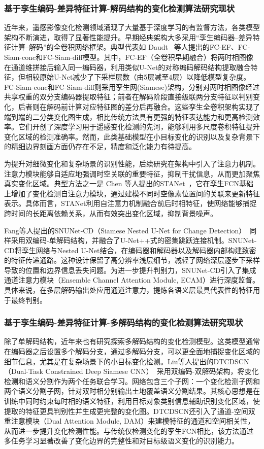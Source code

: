 \subsubsection{基于孪生编码-差异特征计算-解码结构的变化检测算法研究现状}

近年来，遥感影像变化检测领域涌现了大量基于深度学习的有监督方法，各类模型架构不断演进，取得了显著性能提升。早期经典架构大多采用“孪生编码器–差异特征计算–解码”的全卷积网络框架。典型代表如 Daudt~\cite{Daudt2018FullyCS} 等人提出的FC-EF、FC-Siam-conc和FC-Siam-diff模型。其中，FC-EF（全卷积早期融合）将两时相图像在通道维拼接后输入同一编码器，利用类似U-Net的对称编码解码结构提取融合特征，但相较原始U-Net减少了下采样层数（由5层减至4层）以降低模型复杂度。FC-Siam-conc和FC-Siam-diff则采用孪生网(Siamese)架构，分别对两时相图像经过共享权重的双分支编码器提取特征；前者在解码阶段直接级联两分支特征以判别变化，后者则在解码前计算对应特征图的差分后再融合。这些孪生全卷积架构实现了端到端的二分类变化图生成，相比传统方法具有更强的特征表达能力和更高检测效率。它们开创了深度学习用于遥感变化检测的先河，能够利用多尺度卷积特征提升变化区域的检测准确率。然而，此类基础模型在小目标变化的识别以及复杂背景下的精细边界刻画方面仍存在不足，精度和泛化能力有待提高。

为提升对细微变化和复杂场景的识别性能，后续研究在架构中引入了注意力机制。注意力模块能够自适应地强调时空关联的重要特征，抑制干扰信息，从而更加聚焦真实变化区域。典型方法之一是 Chen 等人提出的STANet~\cite{chen_spatial-temporal_2020}，它在孪生FCN基础上增加了变化检测自注意力模块，通过建模不同时空像素位置间的关联来更新特征表示。具体而言，STANet利用自注意力机制融合前后时相特征，使网络能够捕捉跨时间的长距离依赖关系，从而有效突出变化区域，抑制背景噪声。

Fang等人提出的SNUNet-CD（Siamese Nested U-Net for Change Detection）~\cite{Fang2021SNUNetCDAD}同样采用双编码-单解码结构，并融合了U-Net++式的密集跳跃连接机制。SNUNet-CD将孪生网络与Nested U-Net结合，在编码器和解码器以及解码器内部构建致密的特征传递通路。这种设计保留了高分辨率浅层细节，减轻了网络深层逐步下采样导致的位置和边界信息丢失问题。为进一步提升判别力，SNUNet-CD引入了集成通道注意力模块（Ensemble Channel Attention Module, ECAM）进行深度监督。具体来说，在多层解码输出处应用通道注意力，提炼各语义层最具代表性的特征用于最终判别。

\subsubsection{基于孪生编码-差异特征计算-多解码结构的变化检测算法研究现状}
除了单解码结构，近年来也有研究探索多解码结构的变化检测模型。这类模型通常在编码器之后设置多个解码分支，通过多解码分支，可以更全面地捕捉变化区域的细节信息，尤其是在复杂场景下的小目标变化检测。Liu等人提出的DTCDSCN（Dual-Task Constrained Deep Siamese CNN）~\cite{Liu2019BuildingCD}采用双编码-双解码架构，将变化检测和语义分割作为两个任务联合学习。网络包含三个子网：一个变化检测子网和两个语义分割子网，针对双时相分别输出土地覆盖语义分割结果。其核心思想是在训练中同时约束每时相的语义特征，利用目标对象类别信息辅助识别变化区域，使提取的特征更具判别性并生成更完整的变化图。DTCDSCN还引入了通道-空间双重注意模块（Dual Attention Module, DAM）来建模特征的通道和空间相关性，从而进一步提升变化检测性能。与传统仅检测变化的孪生FCN相比，该方法通过多任务学习显著改善了变化边界的完整性和对目标级语义变化的识别能力。

